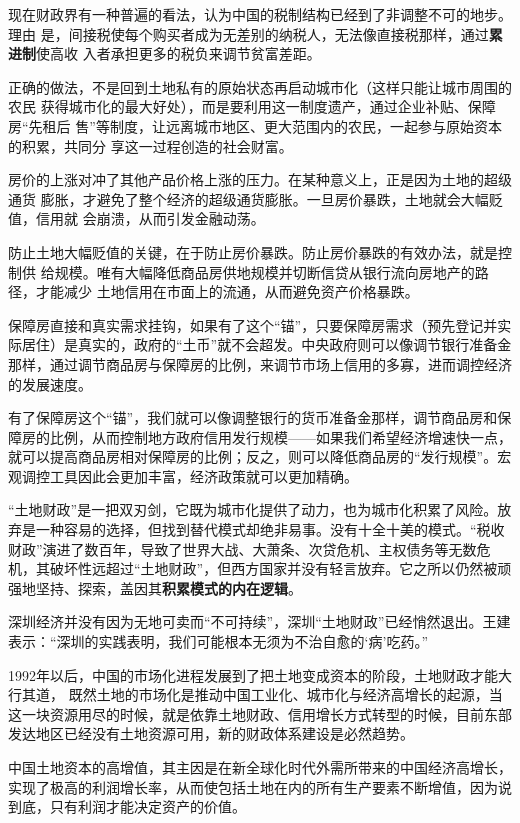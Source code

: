 现在财政界有一种普遍的看法，认为中国的税制结构已经到了非调整不可的地步。理由
是，间接税使每个购买者成为无差别的纳税人，无法像直接税那样，通过\textbf{累进制}使高收
入者承担更多的税负来调节贫富差距。

正确的做法，不是回到土地私有的原始状态再启动城市化（这样只能让城市周围的农民
获得城市化的最大好处），而是要利用这一制度遗产，通过企业补贴、保障房“先租后
售”等制度，让远离城市地区、更大范围内的农民，一起参与原始资本的积累，共同分
享这一过程创造的社会财富。

房价的上涨对冲了其他产品价格上涨的压力。在某种意义上，正是因为土地的超级通货
膨胀，才避免了整个经济的超级通货膨胀。一旦房价暴跌，土地就会大幅贬值，信用就
会崩溃，从而引发金融动荡。

防止土地大幅贬值的关键，在于防止房价暴跌。防止房价暴跌的有效办法，就是控制供
给规模。唯有大幅降低商品房供地规模并切断信贷从银行流向房地产的路径，才能减少
土地信用在市面上的流通，从而避免资产价格暴跌。

保障房直接和真实需求挂钩，如果有了这个“锚”，只要保障房需求（预先登记并实际居住）是真实的，政府的“土币”就不会超发。中央政府则可以像调节银行准备金那样，通过调节商品房与保障房的比例，来调节市场上信用的多寡，进而调控经济的发展速度。

有了保障房这个“锚”，我们就可以像调整银行的货币准备金那样，调节商品房和保障房的比例，从而控制地方政府信用发行规模——如果我们希望经济增速快一点，就可以提高商品房相对保障房的比例；反之，则可以降低商品房的“发行规模”。宏观调控工具因此会更加丰富，经济政策就可以更加精确。

“土地财政”是一把双刃剑，它既为城市化提供了动力，也为城市化积累了风险。放弃是一种容易的选择，但找到替代模式却绝非易事。没有十全十美的模式。“税收财政”演进了数百年，导致了世界大战、大萧条、次贷危机、主权债务等无数危机，其破坏性远超过“土地财政”，但西方国家并没有轻言放弃。它之所以仍然被顽强地坚持、探索，盖因其\textbf{积累模式的内在逻辑}。

深圳经济并没有因为无地可卖而“不可持续”，深圳“土地财政”已经悄然退出。王建表示：“深圳的实践表明，我们可能根本无须为不治自愈的‘病’吃药。”

1992年以后，中国的市场化进程发展到了把土地变成资本的阶段，土地财政才能大行其道，
既然土地的市场化是推动中国工业化、城市化与经济高增长的起源，当这一块资源用尽的时候，就是依靠土地财政、信用增长方式转型的时候，目前东部发达地区已经没有土地资源可用，新的财政体系建设是必然趋势。

中国土地资本的高增值，其主因是在新全球化时代外需所带来的中国经济高增长，实现了极高的利润增长率，从而使包括土地在内的所有生产要素不断增值，因为说到底，只有利润才能决定资产的价值。

